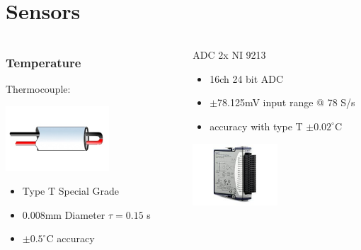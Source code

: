 \documentclass[10pt]{beamer}
\begin{document}
\section{Sensors}
\begin{frame}


\begin{columns}
\begin{column}{0.5\textwidth}
  \frametitle{Temperature}
Thermocouple:
 \begin{center}
     \includegraphics[width=0.6\textwidth]{Therm}
     \end{center}
\begin{itemize}
\item Type T Special Grade
\item 0.008mm Diameter $\tau = 0.15$ s
\item $\pm 0.5^{\circ}$C accuracy

\end{itemize}
\end{column}
\begin{column}{0.5\textwidth}  %
  ADC 2x NI 9213 
     
     \begin{itemize}
      \item 16ch 24 bit ADC
      \item $\pm$78.125mV input range @ 78 S/s
      \item accuracy with type T $\pm 0.02^{\circ}$C
      \end{itemize}
      
       \begin{center}
     \includegraphics[width=0.5\textwidth]{adc}
     \end{center}
\end{column}
\end{columns}
\end{frame}
\end{document}
